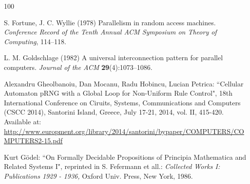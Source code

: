\begin{thebibliography}{100}




 S. Fortune,  J. C. Wyllie (1978)  Parallelism in random access machines. {\em Conference Record of the Tenth Annual ACM Symposium on Theory of Computing},  114--118.

 L. M. Goldschlage (1982)  A universal interconnection pattern for parallel computers. {\em Journal of the ACM} {\bf 29}(4):1073--1086.

 Alexandru Gheolbanoiu, Dan Mocanu, Radu Hobincu, Lucian Petrica: ``Cellular Automaton pRNG with a Global Loop for Non-Uniform Rule Control", 18th International Conference on Ciruits, Systems, Communications and Computers (CSCC 2014), Santorini Island, Greece, July 17-21, 2014, vol. II, 415-420. Available at:  \url{http://www.europment.org/library/2014/santorini/bypaper/COMPUTERS/COMPUTERS2-15.pdf}


 Kurt G\"{o}del: ``On Formally Decidable Propositions of
 Principia Mathematica and Related Systems I", reprinted in S. Fefermann et
 all.: {\em Collected Works I: Publications 1929 - 1936,} Oxford Univ. Press,
 New York, 1986.





\end{thebibliography}
